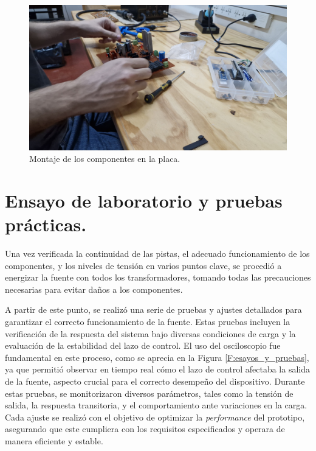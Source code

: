 \begin{figure}[H]
    \centering
    \includegraphics[width=\textwidth]{./imagenes/fotos/montaje.jpg}
    \caption{Montaje de los componentes en la placa.}
    \label{F:montaje_componentes}
\end{figure} \par 

\section{Ensayo de laboratorio y pruebas prácticas.}
Una vez verificada la continuidad de las pistas, el adecuado funcionamiento de los componentes, y los niveles de tensión en varios puntos clave, se procedió a energizar la fuente con todos los transformadores, tomando todas las precauciones necesarias para evitar daños a los componentes.\par 
A partir de este punto, se realizó una serie de pruebas y ajustes detallados para garantizar el correcto funcionamiento de la fuente. Estas pruebas incluyen la verificación de la respuesta del sistema bajo diversas condiciones de carga y la evaluación de la estabilidad del lazo de control. El uso del osciloscopio fue fundamental en este proceso, como se aprecia en la Figura \ref{F:esayos_y_pruebas}, ya que permitió observar en tiempo real cómo el lazo de control afectaba la salida de la fuente, aspecto crucial para el correcto desempeño del dispositivo.
Durante estas pruebas, se monitorizaron diversos parámetros, tales como la tensión de salida, la respuesta transitoria, y el comportamiento ante variaciones en la carga. Cada ajuste se realizó con el objetivo de optimizar la \textit{performance} del prototipo, asegurando que este cumpliera con los requisitos especificados y operara de manera eficiente y estable.\par 

